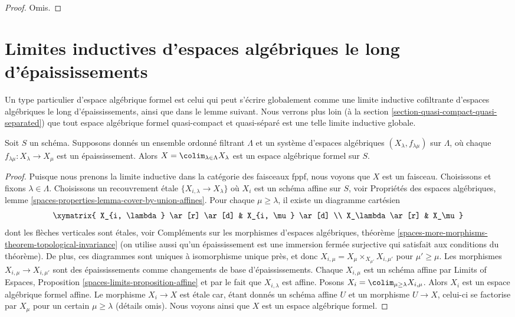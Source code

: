 \begin{proof}
Omis.
\end{proof}






\section{Limites inductives d'espaces algébriques le long d'épaississements}
\label{section-global-colimits}

\noindent
Un type particulier d'espace algébrique formel est celui qui peut s'écrire
globalement comme une limite inductive cofiltrante d'espaces algébriques le long
d'épaississements, ainsi que dans le lemme suivant. Nous verrons plus loin
(à la section \ref{section-quasi-compact-quasi-separated})
que tout espace algébrique formel quasi-compact et quasi-séparé
est une telle limite inductive globale.

\begin{lemma}
\label{lemma-colimit-is-formal}
Soit $S$ un schéma. Supposons donnés un ensemble ordonné filtrant
$\Lambda$ et un système d'espaces algébriques $(X_\lambda, f_{\lambda \mu})$
sur $\Lambda$, où chaque $f_{\lambda \mu} : X_\lambda \to X_\mu$ est un
épaississement. Alors $X = \colim_{\lambda \in \Lambda} X_\lambda$
est un espace algébrique formel sur $S$.
\end{lemma}

\begin{proof}
Puisque nous prenons la limite inductive dans la catégorie des faisceaux fppf,
nous voyons que $X$ est un faisceau. Choisissons et fixons $\lambda \in \Lambda$. Choisissons un
recouvrement étale $\{X_{i, \lambda} \to X_\lambda\}$ où $X_i$ est un schéma
affine sur $S$, voir Propriétés des espaces algébriques, lemme
\ref{spaces-properties-lemma-cover-by-union-affines}.
Pour chaque $\mu \geq \lambda$, il existe un diagramme cartésien
$$
\xymatrix{
X_{i, \lambda} \ar[r] \ar[d] & X_{i, \mu} \ar[d] \\
X_\lambda \ar[r] & X_\mu
}
$$
dont les flèches verticales sont étales, voir
Compléments sur les morphismes d'espaces algébriques, théorème
\ref{spaces-more-morphisms-theorem-topological-invariance}
(on utilise aussi qu'un épaississement est une immersion fermée surjective qui
satisfait aux conditions du théorème). De plus, ces diagrammes sont
uniques à isomorphisme unique près, et donc
$X_{i, \mu} = X_\mu \times_{X_{\mu'}} X_{i, \mu'}$ pour
$\mu' \geq \mu$. Les morphismes $X_{i, \mu} \to X_{i, \mu'}$
sont des épaississements comme changements de base d'épaississements. Chaque $X_{i, \mu}$
est un schéma affine par Limits of Espaces, Proposition
\ref{spaces-limits-proposition-affine} et par le fait que
$X_{i, \lambda}$ est affine.
Posons $X_i = \colim_{\mu \geq \lambda} X_{i, \mu}$. Alors $X_i$ est
un espace algébrique formel affine. Le morphisme $X_i \to X$
est étale car, étant donnés un schéma affine $U$ et un morphisme $U \to X$,
celui-ci se factorise par $X_\mu$ pour un certain $\mu \geq \lambda$ (détails omis).
Nous voyons ainsi que $X$ est un espace algébrique formel.
\end{proof}

